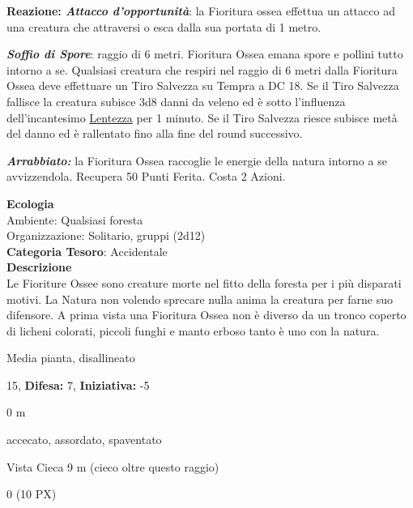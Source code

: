 \begin{multicols}{2}
{\textbf{Reazione: \emph{Attacco d'opportunità}}: la Fioritura ossea effettua un attacco ad una creatura che attraversi o esca dalla sua portata di 1 metro.

\emph{\textbf{Soffio di Spore}}: raggio di 6 metri. Fioritura Ossea emana spore e pollini tutto intorno a se. Qualsiasi creatura che respiri nel raggio di 6 metri dalla Fioritura Ossea deve effettuare un Tiro Salvezza su Tempra a DC 18. Se il Tiro Salvezza fallisce la creatura subisce 3d8 danni da veleno ed è sotto l'influenza dell'incantesimo \hyperlink{lentezza}{Lentezza} per 1 minuto. Se il Tiro Salvezza riesce subisce metà del danno ed è rallentato fino alla fine del round successivo.

\emph{\textbf{Arrabbiato:}} la Fioritura Ossea raccoglie le energie della natura intorno a se avvizzendola. Recupera 50 Punti Ferita. Costa 2 Azioni.

\textbf{Ecologia}\\
Ambiente: Qualsiasi foresta\\
Organizzazione: Solitario, gruppi (2d12)\\
\textbf{Categoria Tesoro}: Accidentale\\
\textbf{Descrizione}\\
Le Fioriture Ossee sono creature morte nel fitto della foresta per i più disparati motivi. La Natura non volendo sprecare nulla anima la creatura per farne suo difensore. A prima vista una Fioritura Ossea non è diverso da un tronco coperto di licheni colorati, piccoli funghi e manto erboso tanto è uno con la natura.

\noindent
\begin{description}[noitemsep, topsep=0pt, parsep=0pt, partopsep=0pt, leftmargin=0cm, labelwidth=2.2cm]
	\item[\textbf{Taglia/Tipo:}] Media pianta, disallineato
	\item[\textbf{Caratt.:}] 
	\item[\textbf{Punti Ferita:}] 15,  \textbf{Difesa:} 7,  \textbf{Iniziativa:} -5
	\item[\textbf{Movimento:}] 0 m
	\item[\textbf{Tiri Salvez.:}] 
	\item[\textbf{Immunità:}] accecato, assordato, spaventato
	\item[\textbf{Sensi:}] Vista Cieca 9 m (cieco oltre questo raggio)
	\item[\textbf{Sfida:}] 0 (10 PX)\smallskip
\end{description}

}
\end{multicols}
